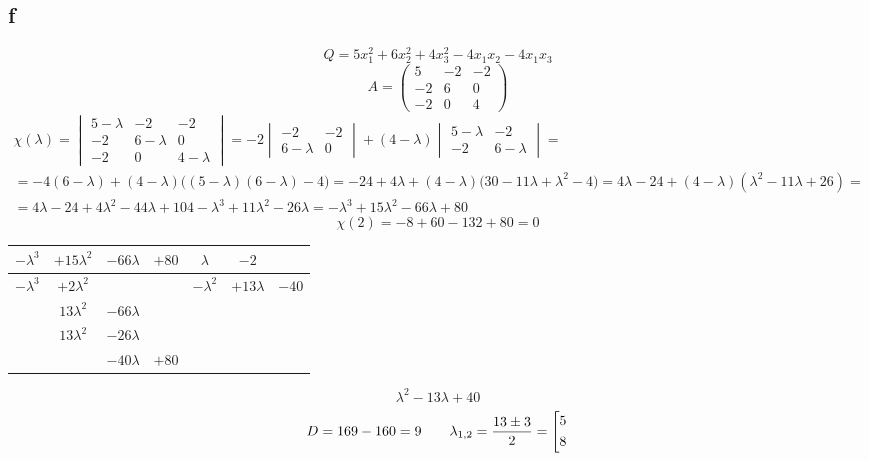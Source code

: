 \subsection{f}

$$ Q = 5x_1^2 + 6x_2^2 + 4x_3^2 - 4x_1x_2 - 4x_1x_3 $$
$$ A =
\begin{pmatrix}
	5 & -2 & -2 \\
    -2 & 6 & 0 \\
    -2 & 0 & 4
\end{pmatrix} $$
\begin{multline*}
    \chi(\lambda) =
    \begin{vmatrix}
        5 - \lambda & -2 & -2 \\
        -2 & 6 - \lambda & 0 \\
        -2 & 0 & 4 - \lambda
    \end{vmatrix} = -2
    \begin{vmatrix}
    	-2 & -2 \\
        6 - \lambda & 0
    \end{vmatrix} + (4 - \lambda)
    \begin{vmatrix}
        5 - \lambda & -2 \\
        -2 & 6 - \lambda
    \end{vmatrix} = \\
    = -4(6 - \lambda) + (4 - \lambda) \bigg( (5 - \lambda)(6 - \lambda) - 4 \bigg) = -24 + 4\lambda + (4 - \lambda) \bigg( 30 - 11\lambda + \lambda^2 - 4 \bigg) = 4\lambda - 24 + (4 - \lambda)(\lambda^2 - 11\lambda + 26) = \\
    = 4\lambda - 24 + 4\lambda^2 - 44\lambda + 104 - \lambda^3 + 11\lambda^2 - 26\lambda = -\lambda^3 + 15\lambda^2 - 66\lambda + 80
\end{multline*}
$$ \chi(2) = -8 + 60 - 132 + 80 = 0 $$
\begin{tabular}{c c c c | c c c}
	$ -\lambda^3 $ & $ +15\lambda^2 $ & $ -66\lambda $ & $ +80 $ & $ \lambda $ & $ -2 $ \\
    \hline
    $ -\lambda^3 $ & $ +2\lambda^2 $ & & & $ -\lambda^2 $ & $ +13\lambda $ & $ -40 $ \\
    \hline
    & $ 13\lambda^2 $ & $ -66\lambda $ & \\
    & $ 13\lambda^2 $ & $ -26\lambda $ & \\
    \hline
    & & $ -40\lambda $ & $ +80 $
\end{tabular}
$$ \lambda^2 - 13\lambda + 40 $$
$$ D = 169 - 160 = 9 \qquad \lambda_{1, 2} = \half[13 \pm 3] = \left[
\begin{aligned}
	5 \\
    8
\end{aligned} \right. $$
